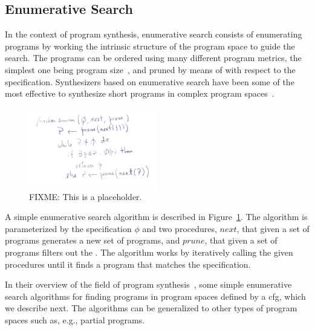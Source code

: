 \subsection{Enumerative Search}
\label{sec:enumerative-search}


In the context of program synthesis, enumerative search consists of
enumerating programs by working the intrinsic structure of the program space to
guide the search. The programs can be ordered using many different program
metrics, the simplest one being program size~\cite{Alur:sygus:2013}, and pruned
by means of  with respect to the
specification. Synthesizers based on enumerative search have been some of the
most effective to synthesize short programs in complex program
spaces~\cite{Gulwani2017}.

\begin{figure}
  \centering
  \includegraphics[width=0.5\textwidth]{assets/enum-01.png}
  \caption{FIXME: This is a placeholder.}
  \label{fig:enum-01}
\end{figure}

A simple enumerative search algorithm is described in Figure~\ref{fig:enum-01}. The
algorithm is parameterized by the specification $\phi{}$ and two procedures,
$next$, that given a set of programs generates a new set of programs, and
$prune$, that given a set of programs filters out the . The algorithm works by iteratively
calling the given procedures until it finds a program that matches the
specification.

In their overview of the field of program synthesis~\cite{Gulwani2017},
\citeauthor{Gulwani2017}  some simple enumerative search algorithms for
finding programs in program spaces defined by a \gls{cfg}, which we describe
next. The algorithms can be generalized to other types of program spaces such
as, e.g., partial programs.

